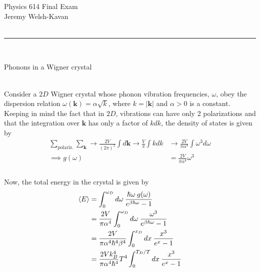 \documentclass[]{article}
\begin{document}
{\Large Physics 614 Final Exam}\\
{Jeremy Welsh-Kavan}\\
\hfill \\
\noindent\rule{15cm}{0.4pt} \\

\begin{enumerate}[1.]

{\bf \item Phonons in a Wigner crystal} \\

Consider a $2D$ Wigner crystal whose phonon vibration frequencies, $\omega$, obey the dispersion relation $\omega(\bm{k})  = \alpha \sqrt{ k}$, where $k = | \bm{k} |$ and $\alpha > 0$ is a constant. Keeping in mind the fact that in $2D$, vibrations can have only 2 polarizations and that the integration over $\bm{k}$ has only a factor of $kdk$, the density of states is given by \\


\begin{equation}
\begin{aligned}
\sum_{\text{polariz.}} \sum_{\bm{k}} \to \frac{2 V }{(2 \pi)^2 } \int d\bm{k} \to \frac{ V }{\pi  } \int k dk & \to  \frac{ 2 V }{ \pi \alpha^4} \int \omega^3 d\omega \\
\implies g(\omega) & = \frac{ 2 V }{ \pi \alpha^4}  \omega^3  \\
\end{aligned}
\end{equation} \\

Now, the total energy in the crystal is given by \\


\begin{equation}
\begin{aligned}
\expval{E} & = \int_{0}^{\omega_D} d\omega \: \frac{ \hbar \omega \: g(\omega) }{ e^{ \beta \hbar \omega} - 1 }  \\
%
& =  \frac{ 2 V }{ \pi \alpha^4}   \int_{0}^{\omega_D} d\omega \: \frac{  \omega^3 }{ e^{ \beta \hbar \omega} - 1 }  \\
%
& =  \frac{ 2 V }{ \pi \alpha^4 \hbar^4 \beta^4}   \int_{0}^{x_D} dx \: \frac{  x^3 }{ e^{ x} - 1 }  \\
%
& =  \frac{ 2 V k_B^4}{ \pi \alpha^4 \hbar^4 }  T^4 \int_{0}^{T_D/T} dx \: \frac{  x^3 }{ e^{ x} - 1 }  \\
%
\end{aligned}
\end{equation} \\


\end{enumerate}
\end{document}
